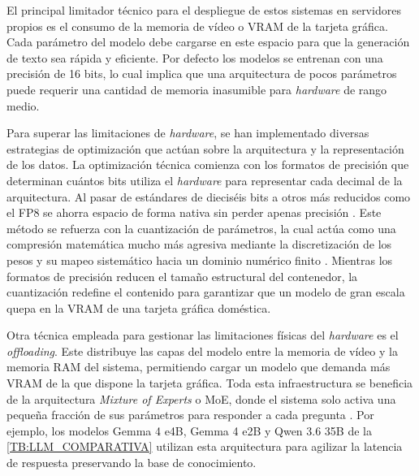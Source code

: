 El principal limitador técnico para el despliegue de estos sistemas en servidores propios es el consumo de la memoria de vídeo o VRAM de la tarjeta gráfica. Cada parámetro del modelo debe cargarse en este espacio para que la generación de texto sea rápida y eficiente. Por defecto los modelos se entrenan con una precisión de 16 bits, lo cual implica que una arquitectura de pocos parámetros puede requerir una cantidad de memoria inasumible para \textit{hardware} de rango medio. 

Para superar las limitaciones de \textit{hardware}, se han implementado diversas estrategias de optimización que actúan sobre la arquitectura y la representación de los datos. La optimización técnica comienza con los formatos de precisión que determinan cuántos bits utiliza el \textit{hardware} para representar cada decimal de la arquitectura. Al pasar de estándares de dieciséis bits a otros más reducidos como el FP8 se ahorra espacio de forma nativa sin perder apenas precisión \cite{micikevicius2022fp8formatsdeeplearning}. Este método se refuerza con la cuantización de parámetros, la cual actúa como una compresión matemática mucho más agresiva mediante la discretización de los pesos y su mapeo sistemático hacia un dominio numérico finito \cite{yadav2025optimizing}. Mientras los formatos de precisión reducen el tamaño estructural del contenedor, la cuantización redefine el contenido para garantizar que un modelo de gran escala quepa en la VRAM de una tarjeta gráfica doméstica.

Otra técnica empleada para gestionar las limitaciones físicas del \textit{hardware} es el \textit{offloading}. Este distribuye las capas del modelo entre la memoria de vídeo y la memoria RAM del sistema, permitiendo cargar un modelo que demanda más VRAM de la que dispone la tarjeta gráfica. Toda esta infraestructura se beneficia de la arquitectura \textit{Mixture of Experts} o MoE, donde el sistema solo activa una pequeña fracción de sus parámetros para responder a cada pregunta \cite{shazeer2017outrageously}. Por ejemplo, los modelos Gemma 4 e4B, Gemma 4 e2B y Qwen 3.6 35B de la \autoref{TB:LLM_COMPARATIVA} utilizan esta arquitectura para agilizar la latencia de respuesta preservando la base de conocimiento.